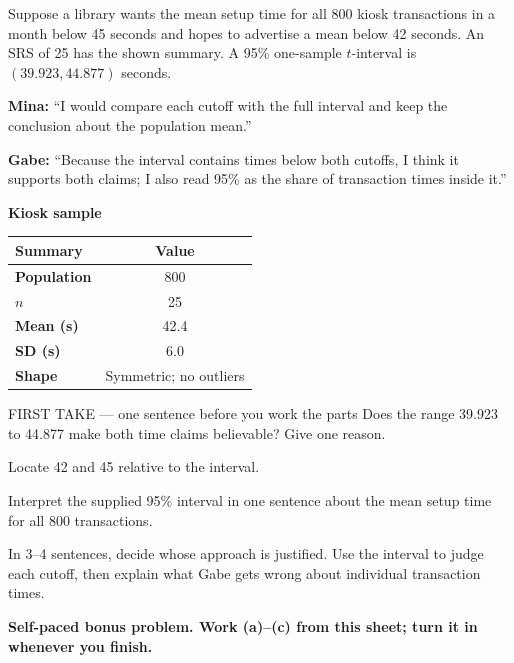 \documentclass[14pt]{extarticle}
\begin{document}
\pagestyle{empty}


\noindent\begin{minipage}[t]{0.57\linewidth}
\vspace{0pt}
Suppose a library wants the mean setup time for all 800 kiosk transactions in a month below 45 seconds and hopes to advertise a mean below 42 seconds. An SRS of 25 has the shown summary. A 95\% one-sample $t$-interval is $(39.923,44.877)$ seconds.\par\smallskip \textbf{Mina:} ``I would compare each cutoff with the full interval and keep the conclusion about the population mean.''\par \textbf{Gabe:} ``Because the interval contains times below both cutoffs, I think it supports both claims; I also read 95\% as the share of transaction times inside it.''\par
\end{minipage}\hfill
\begin{minipage}[t]{0.40\linewidth}
\vspace{0pt}
\begin{center}
\textbf{Kiosk sample}\par\smallskip
\begin{tabular}{|l|c|}
\hline
\textbf{Summary} & \textbf{Value} \\ \hline
\textbf{Population} & 800 \\ \hline
\textbf{$n$} & 25 \\ \hline
\textbf{Mean (s)} & 42.4 \\ \hline
\textbf{SD (s)} & 6.0 \\ \hline
\textbf{Shape} & Symmetric; no outliers \\ \hline
\end{tabular}
\end{center}
\end{minipage}

\begin{firsttakebox}{FIRST TAKE --- one sentence before you work the parts}
Does the range 39.923 to 44.877 make both time claims believable? Give one reason.
\end{firsttakebox}

\begin{description}[leftmargin=1.15in, labelwidth=1in, itemsep=2pt, topsep=2pt]
  \item[\dokbadge{1}~(a)] Locate 42 and 45 relative to the interval.
  \item[\dokbadge{2}~(b)] Interpret the supplied 95\% interval in one sentence about the mean setup time for all 800 transactions.
  \item[\dokbadge{3}~(c)] In 3--4 sentences, decide whose approach is justified. Use the interval to judge each cutoff, then explain what Gabe gets wrong about individual transaction times.
\end{description}

\vfill
\textbf{Self-paced bonus problem. Work (a)--(c) from this sheet; turn it in whenever you finish.}
\end{document}
